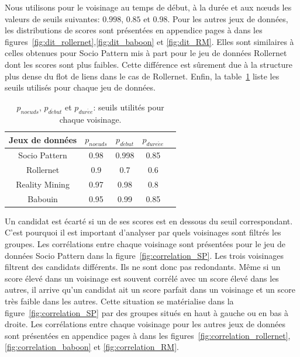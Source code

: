 
Nous utilisons pour le voisinage au temps de début, à la durée et aux n\oe{}uds les valeurs de seuils suivantes: $0.998$, $0.85$ et $0.98$.
Pour les autres jeux de données, les distributions de scores sont présentées en appendice pages \pageref{fig:dit_rollernet} à \pageref{fig:dit_RM} dans les figures~\ref{fig:dit_rollernet},\ref{fig:dit_baboon} et \ref{fig:dit_RM}.
Elles sont similaires à celles obtenues pour Socio Pattern mis à part pour le jeu de données Rollernet dont les scores sont plus faibles.
Cette différence est sûrement due à la structure plus dense du flot de liens dans le cas de Rollernet.
Enfin, la table~\ref{tab:thresholds} liste les seuils utilisés pour chaque jeu de données.
\begin{table}
\centering
\begin{tabular}{|c|c|c|c|c|}
\hline \rule[-1ex]{0pt}{3.5ex}
Jeux de données & $p_{noeuds}$ & $p_{d\acute{e}but}$ & $p_{dure\acute{e}e}$\\
\hline
Socio Pattern & 0.98 & 0.998 & 0.85 \\
Rollernet& 0.9 & 0.7 & 0.6 \\
Reality Mining & 0.97 & 0.98 & 0.8 \\
Babouin & 0.95 & 0.99 & 0.85 \\
\hline
\end{tabular}
\caption{$p_{noeuds}$, $p_{d\acute{e}but}$ et $p_{dur\acute{e}e}$: seuils utilités pour chaque voisinage.}
\label{tab:thresholds} %
\end{table}

Un candidat est écarté si un de ses scores est en dessous du seuil correspondant. 
C'est pourquoi il est important d'analyser par quels voisinages sont filtrés les groupes.
Les corrélations entre chaque voisinage sont présentées pour le jeu de données Socio Pattern dans la figure~\ref{fig:correlation_SP}.
Les trois voisinages filtrent des candidats différents.
Ils ne sont donc pas redondants.
Même si un score élevé dans un voisinage est souvent corrélé avec un score élevé dans les autres, il arrive qu'un candidat ait un score parfait dans un voisinage et un score très faible dans les autres.
Cette situation se matérialise dans la figure~\ref{fig:correlation_SP} par des groupes situés en haut à gauche ou en bas à droite.
Les corrélations entre chaque voisinage pour les autres jeux de données sont présentées en appendice pages \pageref{fig:correlation_rollernet} à \pageref{fig:correlation_RM} dans les figures~\ref{fig:correlation_rollernet},\ref{fig:correlation_baboon} et \ref{fig:correlation_RM}.


